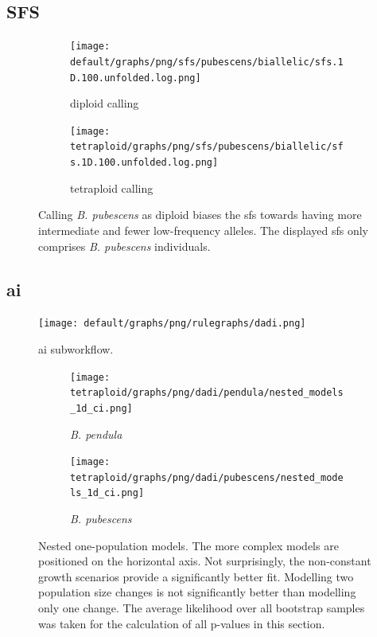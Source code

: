 \documentclass[hidelinks,11pt]{article}
\newcommand{\dadi}{\textdelta a\textdelta i}
\newcommand{\pendula}{\textit{B. pendula}}
\newcommand{\pubescens}{\textit{B. pubescens}}
\begin{document}
    \clearpage

    \subsection{SFS}
    \label{sec:appendix-sfs}

    \begin{figure}[H]
        \centering
        \begin{subfigure}[b]{0.52\textwidth}
            \centering
            \texttt{[image: default/graphs/png/sfs/pubescens/biallelic/sfs.1D.100.unfolded.log.png]}
            \caption{diploid calling}
        \end{subfigure}
        \hspace{-2em}
        \begin{subfigure}[b]{0.52\textwidth}
            \centering
            \texttt{[image: tetraploid/graphs/png/sfs/pubescens/biallelic/sfs.1D.100.unfolded.log.png]}
            \caption{tetraploid calling}
        \end{subfigure}
        \caption{Calling \pubescens{} as diploid biases the \acrshort{sfs} towards having more intermediate and fewer low-frequency alleles. The displayed \acrshort{sfs} only comprises \pubescens{} individuals.}
        \label{fig:sfs_ploidy_calling_differences}
    \end{figure}

    \clearpage

    \subsection{\dadi{}}
    \label{sec:dadi-appendix}

    \begin{figure}[H]
        \centering
        \texttt{[image: default/graphs/png/rulegraphs/dadi.png]}
        \caption{\dadi{} subworkflow.}
        \label{fig:dadi_workflow}
    \end{figure}

    \begin{figure}[H]
        \centering
        \begin{subfigure}[b]{0.49\textwidth}
            \texttt{[image: tetraploid/graphs/png/dadi/pendula/nested\_models\_1d\_ci.png]}
            \caption{\pendula{}}
        \end{subfigure}
        \hfill
        \begin{subfigure}[b]{0.49\textwidth}
            \texttt{[image: tetraploid/graphs/png/dadi/pubescens/nested\_models\_1d\_ci.png]}
            \caption{\pubescens{}}
        \end{subfigure}
        \caption{Nested one-population models. The more complex models are positioned on the horizontal axis. Not surprisingly, the non-constant growth scenarios provide a significantly better fit. Modelling two population size changes is not significantly better than modelling only one change. The average likelihood over all bootstrap samples was taken for the calculation of all p-values in this section.}
        \label{fig:nested_models_1d}
    \end{figure}
\end{document}
